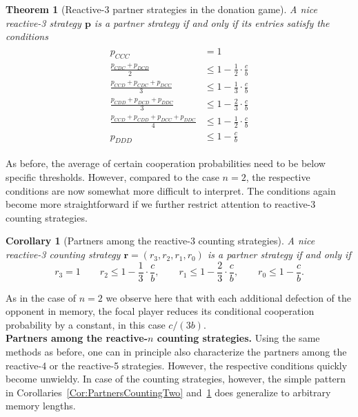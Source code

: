 \documentclass[9pt,twoside,lineno]{pnas-new}
\theoremstyle{plainCl1}
\newtheorem{theorem}{Theorem}
\newtheorem{corollary}{Corollary}
\theoremstyle{plainCl2}
\begin{document}
\begin{theorem}[Reactive-3 partner strategies in the donation game]\label{theorem:reactive_three_partner_strategies}
A nice reactive-3 strategy $\mathbf{p}$ is a partner strategy if and only if its entries satisfy the conditions
\begin{align}\label{eq:three_bit_conditions}
  \begin{split}
  p_{CCC} & = 1 \\
  \frac{p_{CDC} + p_{DCD}}{2} & \leq 1 - \frac{1}{2} \cdot \frac{c}{b} \\
  \frac{p_{CCD} + p_{CDC} + p_{DCC}}{3} & \leq 1 - \frac{1}{3} \cdot \frac{c}{b} \\
  \frac{p_{CDD} + p_{DCD} + p_{DDC}}{3} & \leq 1 - \frac{2}{3} \cdot \frac{c}{b} \\
  \frac{p_{CCD} + p_{CDD} + p_{DCC} + p_{DDC}}{4}  & \leq 1 - \frac{1}{2} \cdot \frac{c}{b}  \\
  p_{DDD} & \leq 1\!-\! \frac{c}{b}
  \end{split}
\end{align}
\end{theorem}

\noindent
As before, the average of certain cooperation probabilities need to be below specific thresholds. 
However, compared to the case $n\!=\!2$, the respective conditions are now somewhat more difficult to interpret. 
The conditions again become more straightforward if we further restrict attention to reactive-3 counting strategies. 

\begin{corollary}[Partners among the reactive-3 counting strategies]
\label{Cor:PartnersCountingThree}
A nice reactive-3 counting strategy $\mathbf{r} \!=\! (r_3, r_2, r_1, r_0)$ is a partner strategy if and only if
\begin{equation}\label{eq:counting_three_bit_conditions}
  \displaystyle r_3 \!=\! 1 \qquad r_2 \le 1\!-\! \frac{1}{3} \cdot \frac{c}{b}, \qquad r_1 \le 1\!-\! \frac{2}{3} \cdot \frac{c}{b}, \qquad  r_0 \le 1\!-\! \frac{c}{b}.
\end{equation}
\end{corollary}

\noindent
As in the case of $n\!=\!2$ we observe here that with each additional defection of the opponent in memory, the focal player reduces its conditional cooperation probability by a constant, in this case $c/(3b)$.\\

\noindent
{\bf Partners among the reactive-$n$ counting strategies.}
Using the same methods as before, one can in principle also characterize the partners among the reactive-4 or the reactive-5 strategies. However, the  respective conditions quickly become unwieldy. 
In case of the counting strategies, however, the simple pattern in Corollaries~\ref{Cor:PartnersCountingTwo} and~\ref{Cor:PartnersCountingThree} does generalize to arbitrary memory lengths. 
\end{document}
